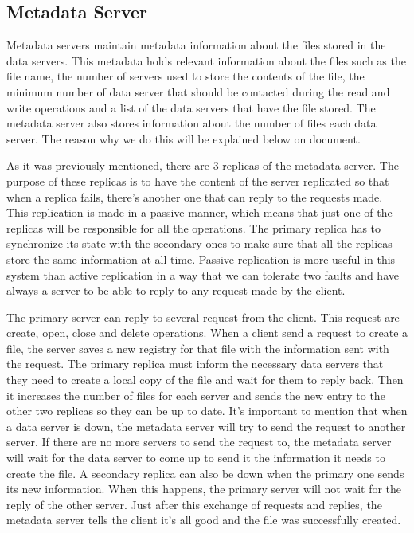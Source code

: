 \subsection{Metadata Server}

Metadata servers maintain metadata information about the files stored
in the data servers. This metadata holds relevant information about
the files such as the file name, the number of servers used to store
the contents of the file, the minimum number of data server that should
be contacted during the read and write operations and a list of the
data servers that have the file stored. The metadata server also stores
information about the number of files each data server. The reason why
we do this will be explained below on document.

As it was previously mentioned, there are 3 replicas of the metadata
server. The purpose of these replicas is to have the content of the
server replicated so that when a replica fails, there's another one
that can reply to the requests made. This replication is made in a
passive manner, which means that just one of the replicas will be
responsible for all the operations. The primary replica has to
synchronize its state with the secondary ones to make sure that all
the replicas store the same information at all time. Passive replication
is more useful in this system than active replication in a way that we
can tolerate two faults and have always a server to be able to reply to
any request made by the client.

The primary server can reply to several request from the client. This
request are create, open, close and delete operations.
When a client send a request to create a file, the server saves a new
registry for that file with the information sent with the request. The
primary replica must inform the necessary data servers that they need to
create a local copy of the file and wait for them to reply back. Then
it increases the number of files for each server and sends the new 
entry to the other two replicas so they can be up to date. It's important 
to mention that when a data server is down, the metadata server will try 
to send the request to another server. If there are no more servers to 
send the request to, the metadata server will wait for the data server 
to come up to send it the information it needs to create the file. A 
secondary replica can also be down when the primary one sends its new 
information. When this happens, the primary server will not wait for 
the reply of the other server. Just after this exchange of requests and
replies, the metadata server tells the client it's all good and the file 
was successfully created.

